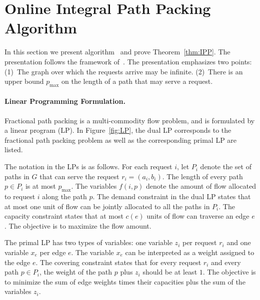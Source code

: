 \documentclass[11pt]{article}
\newcommand{\route}{\text{\sc{ipp}}}
\newcommand{\pmax}{p_{\max}}
\newenvironment{proof sketch}[1]{\noindent {\emph{Proof sketch of #1:}}}{\hfill \qed}
\begin{document}
\section{Online Integral Path Packing Algorithm \route}
\label{sect:routealg} \label{sec:IPP} In this section we present algorithm \route\
and prove Theorem~\ref{thm:IPP}. The presentation follows the framework
of~\cite{BN06,BNsurvey}. The presentation emphasizes two points: (1)~The graph over
which the requests arrive may be infinite. (2)~There is an upper bound $\pmax$ on the length
of a path that may serve a request.

\paragraph{Linear Programming Formulation.}
Fractional path packing is a multi-commodity flow problem, and is formulated by a
linear program (LP). In Figure~\ref{fig:LP}, the dual LP corresponds to the
fractional path packing problem as well as the corresponding primal LP are listed.

The notation in the LPs is as follows. For each request $i$, let $P_i$ denote the set
of paths in $G$ that can serve the request $r_i=(a_i,b_i)$. The length of every path
$p \in P_i$ is at most $\pmax$.  The variables $f(i,p)$ denote the amount of flow
allocated to request $i$ along the path $p$. The demand constraint in the dual LP
states that at most one unit of flow can be jointly allocated to all the paths in
$P_i$. The capacity constraint states that at most $c(e)$ units of flow can traverse
an edge $e$. The objective is to maximize the flow amount.

The primal LP has two types of variables: one variable $z_i$ per request $r_i$ and
one variable $x_e$ per edge $e$. The variable $x_e$ can be interpreted as a weight
assigned to the edge $e$. The covering constraint states that for every request $r_i$
and every path $p\in P_i$, the weight of the path $p$ plus $z_i$ should be at least
$1$. The objective is to minimize the sum of edge weights times their capacities plus
the sum of the variables $z_i$.
\end{document}
